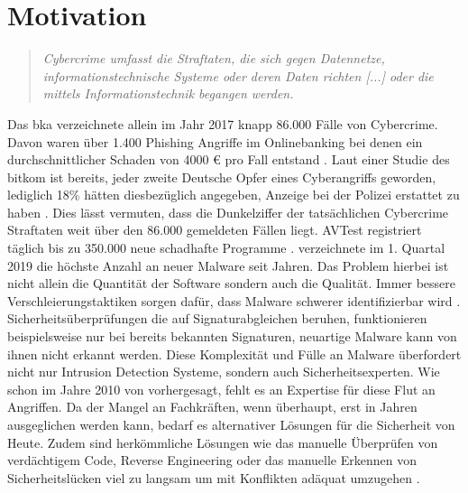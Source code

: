 \documentclass[
    12pt, %
    DIV10,
    ngerman, %
    a4paper, %
    oneside, %
    titlepage, %
    parskip=half, %
    headings=normal, %
    listof=totoc, %
    bibliography=totoc, %
    index=totoc, %
    captions=tableheading, %
    final %
]{scrreprt}
\begin{document}
\section{Motivation}
\begin{quote}
\textsl{Cybercrime umfasst die Straftaten, die sich gegen Datennetze, informationstechnische Systeme
oder deren Daten richten [...] oder die mittels Informationstechnik
begangen werden. \parencite{Cybercrime2017}}
\end{quote}
Das \ac{bka} verzeichnete allein im Jahr 2017 knapp 86.000 Fälle von Cybercrime. Davon waren über 1.400 Phishing Angriffe im Onlinebanking bei denen ein durchschnittlicher Schaden von 4000 € pro Fall entstand \parencite{Cybercrime2017}. Laut einer Studie des \ac{bitkom} ist bereits, jeder zweite Deutsche Opfer eines Cyberangriffs geworden, lediglich 18\% hätten diesbezüglich angegeben, Anzeige bei der Polizei erstattet zu haben \parencite{Bitkome.V.2017}. Dies lässt vermuten, dass die Dunkelziffer der tatsächlichen Cybercrime Straftaten weit über den 86.000 gemeldeten Fällen liegt. AVTest registriert täglich bis zu 350.000 neue schadhafte Programme \parencite{AV-TEST2019}. \textcite{McAfee2019} verzeichnete im 1. Quartal 2019 die höchste Anzahl an  neuer Malware seit Jahren. Das Problem hierbei ist nicht allein die Quantität der Software sondern auch die Qualität. Immer bessere Verschleierungstaktiken sorgen dafür, dass Malware schwerer identifizierbar wird \parencite{he2017model}. Sicherheitsüberprüfungen die auf Signaturabgleichen beruhen, funktionieren beispielsweise nur bei bereits bekannten Signaturen, neuartige Malware kann von ihnen nicht erkannt werden. Diese Komplexität und Fülle an Malware überfordert nicht nur Intrusion Detection Systeme, sondern auch Sicherheitsexperten. Wie schon im Jahre 2010 von \textcite{Evans2010} vorhergesagt, fehlt es an Expertise für diese Flut an Angriffen. Da der Mangel an Fachkräften, wenn überhaupt, erst in Jahren ausgeglichen werden kann, bedarf es alternativer Lösungen für die Sicherheit von Heute. Zudem sind herkömmliche Lösungen wie das manuelle Überprüfen von verdächtigem Code, Reverse Engineering oder das manuelle Erkennen von Sicherheitslücken viel zu langsam um mit Konflikten adäquat umzugehen \parencite{Singla2019}.
\\\\ 
\end{document}
